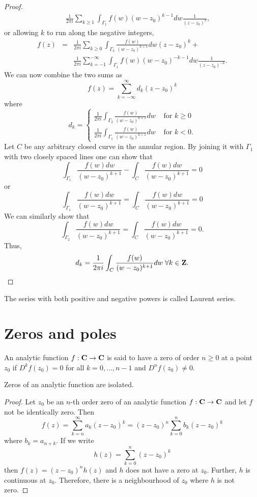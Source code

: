 \begin{proof}
\begin{eqnarray*}
 & & \frac{1}{2\pi i}
\sum_{k \ge 1}\int_{\Gamma_1}f(w)(w - z_0)^{k-1}dw \frac{1}{(z - z_0)^{k}},
\end{eqnarray*}
or allowing $k$ to run along the negative integers,
\begin{eqnarray*}
f(z) &=& \frac{1}{2\pi i}
\sum_{k \ge 0}\int_{\Gamma_2}\frac{f(w)}{(w - z_0)^{k+1}}dw (z-z_0)^k + \\
 & & \frac{1}{2\pi i}
 \sum_{k=-1}^{-\infty}\int_{\Gamma_1}f(w)(w - z_0)^{-k-1}dw 
\frac{1}{(z - z_0)^{-k}}.
\end{eqnarray*}
We can now combine the two sums as
\[
f(z) = \sum_{k=-\infty}^\infty d_k (z - z_0)^k
\]
where
\[
d_k = \begin{cases}
\frac{1}{2\pi i}
\int_{\Gamma_2}\frac{f(w)}{(w - z_0)^{k+1}}dw & \text{ for } k \ge 0 \\
\frac{1}{2\pi i}
\int_{\Gamma_1}\frac{f(w)}{(w - z_0)^{k+1}}dw & \text{ for } k < 0 .
\end{cases}
\]
Let $C$ be any arbitrary closed curve in the annular region. By joining it
with $\Gamma_1$ with two closely spaced lines one can show that
\[
\int_{\Gamma_1}\frac{f(w)dw}{(w - z_0)^{k+1}} - 
\int_C\frac{f(w)dw}{(w - z_0)^{k+1}} = 0
\]
or 
\[
\int_{\Gamma_1}\frac{f(w)dw}{(w - z_0)^{k+1}} = 
\int_C\frac{f(w)dw}{(w - z_0)^{k+1}} = 0
\]
We can similarly show that
\[
\int_{\Gamma_2}\frac{f(w)dw}{(w - z_0)^{k+1}} = 
\int_C\frac{f(w)dw}{(w - z_0)^{k+1}} = 0.
\]
Thus,
\[
d_k = \frac{1}{2\pi i}\int_C \frac{f(w)}{(w - z_0)^{k + 1}}dw \;\forall k \in
\mathbf{Z}.
\]
\end{proof}
\begin{rem}
The series with both positive and negative powers is called Laurent series.
\end{rem}

\section{Zeros and poles}\label{c5s2}
\begin{defn}\label{c5s2d1}
An analytic function $f: \mathbf{C} \rightarrow \mathbf{C}$ is said to have a zero of
order $n \ge 0$ at a point $z_0$ if $D^kf(z_0) = 0$ for all $k = 0, \ldots,
n - 1$ and $D^nf(z_0) \ne 0$.
\end{defn}

\begin{thm}\label{c5s2t1}
Zeros of an analytic function are isolated.
\end{thm}
\begin{proof}
Let $z_0$ be an $n$-th order zero of an analytic function $f:\mathbf{C} \rightarrow
\mathbf{C}$ and let $f$ not be identically zero. Then
\[
f(z) = \sum_{k=n}^\infty a_k(z - z_0)^k = (z - z_0)^n \sum_{k=0}^n b_k(z-z_0)^k
\]
where $b_k = a_{n+k}$. If we write 
\[
h(z) = \sum_{k=0}^n(z - z_0)^k
\]
then $f(z) = (z - z_0)^n h(z)$ and $h$ does not have a zero at $z_0$. Further,
$h$ is continuous at $z_0$. Therefore, there is a neighbourhood of $z_0$ where
$h$ is not zero.
\end{proof}

